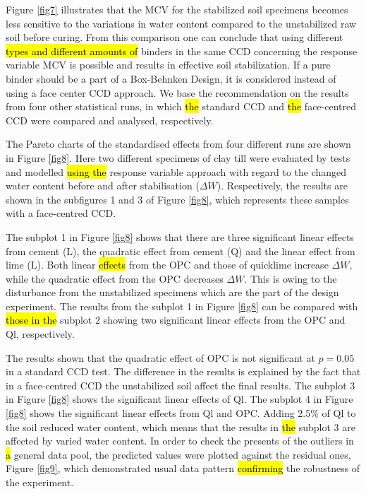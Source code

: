 \documentclass[eprint,
]{actapoly}
\begin{document}
Figure \ref{fig7} illustrates that the MCV for the stabilized soil specimens becomes less sensitive to the variations in water content compared to the unstabilized raw soil before curing. From this comparison one can conclude that using different \hl{types and different amounts of }binders\hl{ }in the same CCD concerning the response variable MCV is possible and results in effective soil stabilization. If a pure binder should be a part of a Box-Behnken Design, it is considered instead of using a face center CCD approach. We base the recommendation on the results from four other statistical runs, in which \hl{the }standard CCD and\hl{ the }face-centred CCD were compared and analysed, respectively. 

The Pareto charts of the standardised effects from four different runs are shown in Figure \ref{fig8}. Here two different specimens of clay till were evaluated by tests and modelled\hl{ using the }response variable approach with regard to the changed water content before and after stabilisation ($\Delta W$). Respectively, the results are shown in the\hl{ }subfigures 1 and 3 of Figure \ref{fig8}, which represents these samples with a face-centred CCD. 

The subplot 1 in Figure \ref{fig8} shows that there are three significant linear effects from cement (L), the quadratic effect from cement (Q) and the linear effect from lime (L). Both linear \hl{effects }from the OPC and those of quicklime increase $\Delta W$, while the quadratic effect from the OPC decreases $\Delta W$. This is owing to the disturbance from the unstabilized specimens which are the part of the design experiment. The results from the subplot 1 in Figure \ref{fig8} can be compared with \hl{those in the }subplot 2 showing\hl{ }two significant linear effects from the OPC and Ql, respectively. 

The results shown that the quadratic effect of OPC is not significant at $p=0.05$ in a standard CCD test. The difference in the results is explained by the fact that in a face-centred CCD the unstabilized soil affect the final results. The subplot 3 in Figure \ref{fig8} shows the significant linear effects of Ql. The subplot 4 in Figure \ref{fig8} shows the significant linear effects from Ql and OPC. Adding 2.5\% of Ql to the soil reduced water content, which means that the results in \hl{the }subplot 3 are affected by varied water content. In order to check the presents of the outliers in \hl{a }general data pool, the predicted values were plotted against the residual ones, Figure \ref{fig9}, which demonstrated usual data pattern \hl{confirming }the robustness of the experiment. 
\end{document}
